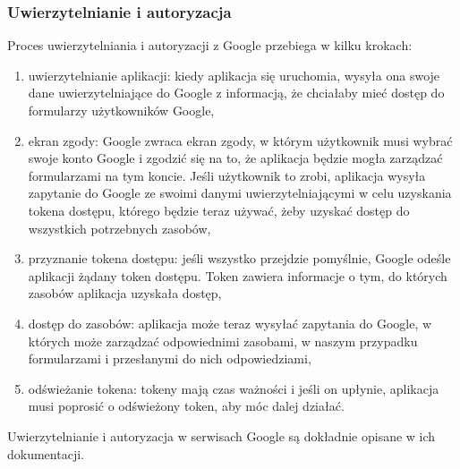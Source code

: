 \subsubsection{Uwierzytelnianie i autoryzacja}
Proces uwierzytelniania i autoryzacji z Google przebiega w kilku krokach:
\begin{enumerate}
  \item uwierzytelnianie aplikacji: kiedy aplikacja się uruchomia, wysyła ona swoje
    dane uwierzytelniające do Google z informacją, że chciałaby mieć dostęp do 
    formularzy użytkowników Google,
  \item ekran zgody: Google zwraca ekran zgody, w którym użytkownik musi wybrać swoje
    konto Google i zgodzić się na to, że aplikacja będzie mogła zarządzać formularzami
    na tym koncie. Jeśli użytkownik to zrobi, aplikacja wysyła zapytanie do Google
    ze swoimi danymi uwierzytelniającymi w celu uzyskania tokena dostępu, którego
    będzie teraz używać, żeby uzyskać dostęp do wszystkich potrzebnych zasobów,
  \item przyznanie tokena dostępu: jeśli wszystko przejdzie pomyślnie, Google
    odeśle aplikacji żądany token dostępu. Token zawiera informacje o tym, do których
    zasobów aplikacja uzyskała dostęp, 
  \item dostęp do zasobów: aplikacja może teraz wysyłać zapytania do Google, w których
    może zarządzać odpowiednimi zasobami, w naszym przypadku formularzami i przesłanymi
    do nich odpowiedziami,
  \item odświeżanie tokena: tokeny mają czas ważności i jeśli on upłynie, aplikacja
    musi poprosić o odświeżony token, aby móc dalej działać.
\end{enumerate}
Uwierzytelnianie i autoryzacja w serwisach Google są dokładnie opisane
w ich dokumentacji.

